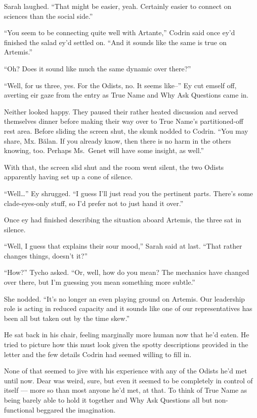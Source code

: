 Sarah laughed. ``That might be easier, yeah. Certainly easier to connect on sciences than the social side.''

``You seem to be connecting quite well with Artante,'' Codrin said once ey'd finished the salad ey'd settled on. ``And it sounds like the same is true on Artemis.''

``Oh? Does it sound like much the same dynamic over there?''

``Well, for us three, yes. For the Odists, no. It seems like--'' Ey cut emself off, averting eir gaze from the entry as True Name and Why Ask Questions came in.

Neither looked happy. They paused their rather heated discussion and served themselves dinner before making their way over to True Name's partitioned-off rest area. Before sliding the screen shut, the skunk nodded to Codrin. ``You may share, Mx. Bălan. If you already know, then there is no harm in the others knowing, too. Perhaps Ms.~Genet will have some insight, as well.''

With that, the screen slid shut and the room went silent, the two Odists apparently having set up a cone of silence.

``Well\ldots{}'' Ey shrugged. ``I guess I'll just read you the pertinent parts. There's some clade-eyes-only stuff, so I'd prefer not to just hand it over.''

Once ey had finished describing the situation aboard Artemis, the three sat in silence.

``Well, I guess that explains their sour mood,'' Sarah said at last. ``That rather changes things, doesn't it?''

``How?'' Tycho asked. ``Or, well, how do you mean? The mechanics have changed over there, but I'm guessing you mean something more subtle.''

She nodded. ``It's no longer an even playing ground on Artemis. Our leadership role is acting in reduced capacity and it sounds like one of our representatives has been all but taken out by the time skew.''

He sat back in his chair, feeling marginally more human now that he'd eaten. He tried to picture how this must look given the spotty descriptions provided in the letter and the few details Codrin had seemed willing to fill in.

None of that seemed to jive with his experience with any of the Odists he'd met until now. Dear was weird, sure, but even it seemed to be completely in control of itself — more so than most anyone he'd met, at that. To think of True Name as being barely able to hold it together and Why Ask Questions all but non-functional beggared the imagination.


